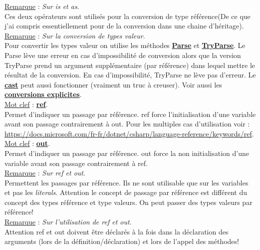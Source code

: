 \documentclass[a4paper,12pt,twoside]{article}
\newcommand{\urlcolor}{magenta}  %
\newcommand{\keycolor}{purple} %
\newcommand{\incode}[1]{{\footnotesize\ttfamily #1}} %
\newcommand{\rem}[2]{\noindent\underline{Remarque} : \textit{#1}.\\ \indent #2}
\newcommand{\keyref}[2]{\hypersetup{urlcolor=\keycolor} \href{#1}{\textbf{#2}}\hypersetup{urlcolor=\urlcolor}}
\newcommand{\keyword}[3]{\noindent\underline{Mot clef} : \keyref{#1}{#2}. \\ \indent #3}
\begin{document}
\rem{Sur \incode{is} et \incode{as}}{Ces deux opérateurs sont utilisés pour la conversion de type référence(De ce que j'ai compris essentiellement pour de la conversion dans une chaine d'héritage).}\\

\rem{Sur la conversion de types valeur}{Pour convertir les types valeur on utilise les méthodes \keyref{https://docs.microsoft.com/fr-fr/dotnet/api/system.int32.parse?view=net-6.0}{Parse} et \keyref{https://docs.microsoft.com/fr-fr/dotnet/api/system.int32.tryparse?view=net-6.0}{TryParse}. Le \incode{Parse} lève une erreur en cas d'impossibilité de conversion alors que la version \incode{TryParse} prend un argument supplémentaire (par référence) dans lequel mettre le résultat de la conversion. En cas d'impossibilité, \incode{TryParse} ne lève pas d'erreur. Le \keyref{https://docs.microsoft.com/fr-fr/dotnet/csharp/language-reference/operators/type-testing-and-cast\#cast-expression}{cast} peut aussi fonctionner (vraiment un truc à creuser). Voir aussi les \keyref{https://docs.microsoft.com/fr-fr/dotnet/csharp/language-reference/language-specification/conversions\#explicit-conversions}{conversions explicites}.}\\

\keyword{https://docs.microsoft.com/fr-fr/dotnet/csharp/language-reference/keywords/ref}{ref}{Permet d'indiquer un passage par référence. \incode{ref} force l'initialisation d'une variable avant son passage contrairement à \incode{out}. Pour les multiples cas d'utilisation voir : \url{https://docs.microsoft.com/fr-fr/dotnet/csharp/language-reference/keywords/ref}.}\\

\keyword{https://docs.microsoft.com/fr-fr/dotnet/csharp/language-reference/keywords/out-parameter-modifier}{out}{Permet d'indiquer un passage par référence. \incode{out} force la non initialisation d'une variable avant son passage contrairement à \incode{ref}.}\\

\rem{Sur \incode{ref} et \incode{out}}{Permettent les passages par référence. Ils ne sont utilisable que sur les variables et pas les \textit{literals}. Attention le concept de passage par référence est différent du concept des types référence et type valeurs. On peut passer des types valeurs par référence!}\\

\rem{Sur l'utilisation de \incode{ref} et \incode{out}}{Attention \incode{ref} et \incode{out} doivent être déclarés à la fois dans la déclaration des arguments (lors de la définition/déclaration) et lors de l'appel des méthodes!}\\
\end{document}
